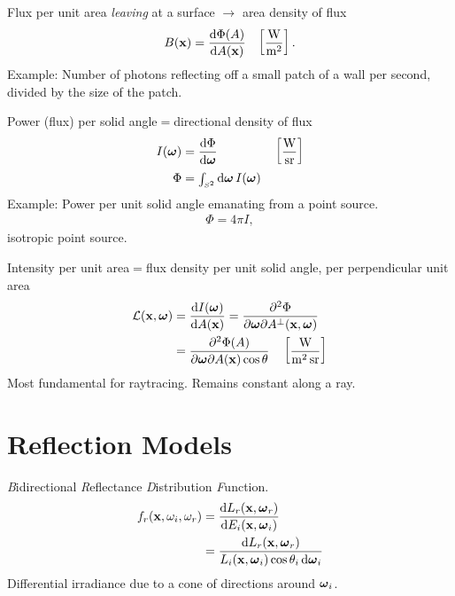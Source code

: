 \begin{compactdesc}
			Flux per unit area \emph{leaving} at a surface $\to$ area density of flux
			\begin{align*}
				B(\bm{\mathrm{x}})=\frac{\mathrm d \Phi(A)}{\mathrm d A(\bm{\mathrm{x}})} &&\left[ \frac{\si{\watt}}{\si{\meter\squared}} \right].
			\end{align*}
			Example: Number of photons reflecting off a small patch of a wall per second, divided by the size of the patch. 		\item[\lp{Radiant intensity}]
			Power (flux) per solid angle$=$directional density of flux
			\begin{align*}
				I(\vtr{\omega})&=\dv{\Phi}{\vtr{\omega}}&& \left[ \frac{\si{\watt}}{\si{\steradian}} \right]\\
				\Phi&={\scriptstyle\int_{S^2}^{}}\dd{\vtr{\omega}}\, I(\vtr{\omega})
			\end{align*}
			Example: Power per unit solid angle emanating from a point source.
			\begin{gather*}
				\Phi=4\pi I,
			\end{gather*}
			isotropic point source.
		\item[\lp{Radiance}]
			Intensity per unit area$=$flux density per unit solid angle, per perpendicular unit area
			\begin{align*}
				\mathcal{L}(\vtr{x},\vtr{\omega})&=\dv{I(\vtr{\omega})}{A(\vtr{x})}
				=\pdvv{\Phi}{\vtr{\omega}}{A^{\perp}(\vtr{x},\vtr{\omega})}\\
				&=\pdvv{\Phi(A)}{\vtr{\omega}}{A(\vtr{x})\cos\theta}\quad \left[ \frac{\si{\watt}}{\si{\meter\squared\steradian}} \right]
			\end{align*}
			Most fundamental for raytracing. Remains constant along a ray.
\section{Reflection Models}
\item[\lp{BRDF}] \emph{B}idirectional \emph{R}eflectance \emph{D}istribution \emph{F}unction.
	\begin{align*}
		f_r(\vtr{x},\omega_i,\omega_r)&=\dv{L_r(\vtr{x},\vtr{\omega}_r)}{E_i(\vtr{x},\vtr{\omega}_i)}\\
		&=\frac{\dd{L_r(\vtr{x},\vtr{\omega}_r)}}{L_i(\vtr{x},\vtr{\omega}_i)\cos\theta_i\dd{\vtr{\omega}}_i}
	\end{align*}
	Differential irradiance due to a cone of directions around $\bm{\mathrm{\omega}}_i$.
\end{compactdesc}
